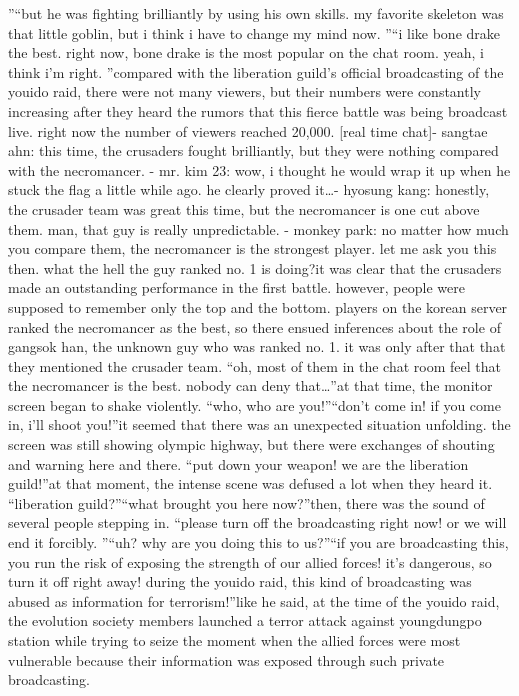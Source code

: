 ”“but he was fighting brilliantly by using his own skills.
 my favorite skeleton was that little goblin, but i think i have to change my mind now.
”“i like bone drake the best.
 right now, bone drake is the most popular on the chat room.
 yeah, i think i’m right.
”compared with the liberation guild’s official broadcasting of the youido raid, there were not many viewers, but their numbers were constantly increasing after they heard the rumors that this fierce battle was being broadcast live.
right now the number of viewers reached 20,000.
[real time chat]- sangtae ahn: this time, the crusaders fought brilliantly, but they were nothing compared with the necromancer.
- mr.
 kim 23: wow, i thought he would wrap it up when he stuck the flag a little while ago.
 he clearly proved it…- hyosung kang: honestly, the crusader team was great this time, but the necromancer is one cut above them.
 man, that guy is really unpredictable.
- monkey park: no matter how much you compare them, the necromancer is the strongest player.
 let me ask you this then.
 what the hell the guy ranked no.
 1 is doing?it was clear that the crusaders made an outstanding performance in the first battle.
however, people were supposed to remember only the top and the bottom.
players on the korean server ranked the necromancer as the best, so there ensued inferences about the role of gangsok han, the unknown guy who was ranked no.
 1.
 it was only after that that they mentioned the crusader team.
“oh, most of them in the chat room feel that the necromancer is the best.
 nobody can deny that…”at that time, the monitor screen began to shake violently.
“who, who are you!”“don’t come in! if you come in, i’ll shoot you!”it seemed that there was an unexpected situation unfolding.
 the screen was still showing olympic highway, but there were exchanges of shouting and warning here and there.
“put down your weapon! we are the liberation guild!”at that moment, the intense scene was defused a lot when they heard it.
“liberation guild?”“what brought you here now?”then, there was the sound of several people stepping in.
“please turn off the broadcasting right now! or we will end it forcibly.
”“uh? why are you doing this to us?”“if you are broadcasting this, you run the risk of exposing the strength of our allied forces! it’s dangerous, so turn it off right away! during the youido raid, this kind of broadcasting was abused as information for terrorism!”like he said, at the time of the youido raid, the evolution society members launched a terror attack against youngdungpo station while trying to seize the moment when the allied forces were most vulnerable because their information was exposed through such private broadcasting.


